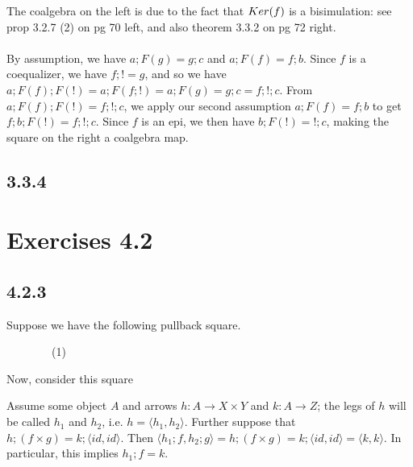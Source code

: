 \documentclass{article}
\begin{document}
The coalgebra on the left is due to the fact that $\mit{Ker}(f)$ is a bisimulation: see prop 3.2.7 (2) on pg 70 left,
and also theorem 3.3.2 on pg 72 right.\\~\\
By assumption, we have $a;F(g) = g;c$ and $a;F(f) = f;b$. Since $f$ is a coequalizer, we have $f;! = g$, and so
we have $a;F(f);F(!) = a;F(f;!) = a;F(g) = g;c = f;!;c$. From $a;F(f);F(!) = f;!;c$, we apply our second assumption
$a;F(f) = f;b$ to get $f;b;F(!) = f;!;c$. Since $f$ is an epi, we then have $b;F(!) = !;c$, making the square on
the right a coalgebra map.

\subsection*{3.3.4}

\section*{Exercises 4.2}

\subsection*{4.2.3}
Suppose we have the following pullback square.
\begin{center}
~~~~~~~~(1)
\end{center}
Now, consider this square
\begin{center}
\end{center}
Assume some object $A$ and arrows $h : A \to X \times Y$ and $k : A \to Z$; the legs of $h$ will be called
$h_1$ and $h_2$, i.e. $h = \langle h_1, h_2 \rangle$. Further suppose that $h;(f \times g) = k;\langle id, id \rangle$.
Then $\langle h_1;f, h_2;g \rangle = h;(f \times g) = k;\langle id, id \rangle = \langle k, k \rangle$.
In particular, this implies $h_1;f = k$.
\begin{center}
\end{center}
\end{document}

